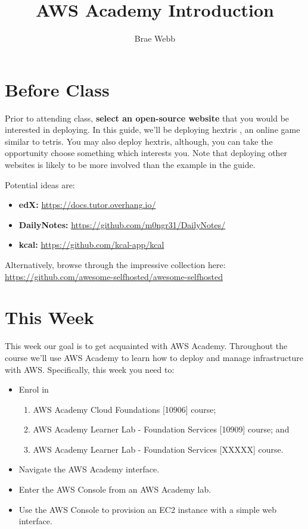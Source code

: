 \documentclass{csse4400}
\title{AWS Academy Introduction}
\author{Brae Webb}
\date{\week{1}}
\begin{document}
\maketitle

\section{Before Class}
Prior to attending class, \textbf{select an open-source website} that you would be interested in deploying.
In this guide, we'll be deploying hextris \cite{hextris}, an online game similar to tetris.
You may also deploy hextris, although,
you can take the opportunity choose something which interests you.
Note that deploying other websites is likely to be more involved than the example in the guide.

Potential ideas are:
\begin{itemize}
    \item \textbf{edX:} \url{https://docs.tutor.overhang.io/}
    \item \textbf{DailyNotes:} \url{https://github.com/m0ngr31/DailyNotes/}
    \item \textbf{kcal:} \url{https://github.com/kcal-app/kcal} 
\end{itemize}

\noindent Alternatively, browse through the impressive collection here:\\ \url{https://github.com/awesome-selfhosted/awesome-selfhosted}

\section{This Week}
This week our goal is to get acquainted with AWS Academy.
Throughout the course we'll use AWS Academy to learn how to deploy and manage infrastructure with AWS.
Specifically, this week you need to:
\begin{itemize}
    \item Enrol in
    \begin{enumerate}
        \item AWS Academy Cloud Foundations [10906] course;
        \item AWS Academy Learner Lab - Foundation Services [10909] course; and
        \item AWS Academy Learner Lab - Foundation Services [XXXXX] course. 
    \end{enumerate}
    \item Navigate the AWS Academy interface.
    \item Enter the AWS Console from an AWS Academy lab.
    \item Use the AWS Console to provision an EC2 instance with a simple web interface.
\end{itemize}
\end{document}

